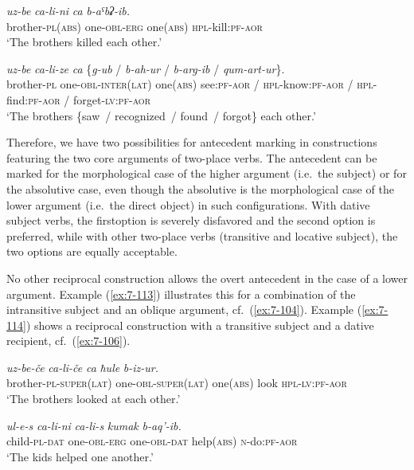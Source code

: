 ﻿\documentclass[output=paper]{langsci/langscibook}
\begin{document}
\ea %
\gll \emph{uz-be} \emph{ca-li-ni} \emph{ca} \emph{b-aˤbʡ-ib.}\\
brother-\textsc{pl}(\textsc{abs}) one-\textsc{obl}-\textsc{erg} one(\textsc{abs}) \textsc{hpl}-kill:\textsc{pf}-\textsc{aor}\\
\glt `The brothers killed each other.'

\ex\label{ex:7-112}
\gll \emph{uz-be} \emph{ca-li-ze} \emph{ca} \{\emph{g-ub} / \emph{b-ah-ur} / \emph{b-arg-ib} / \emph{qum-art-ur}\}.\\
brother-\textsc{pl} one-\textsc{obl}-\textsc{inter(lat)} one(\textsc{abs}) see:\textsc{pf}-\textsc{aor} / \textsc{hpl}-know:\textsc{pf}-\textsc{aor} / \textsc{hpl}-find:\textsc{pf}-\textsc{aor} / forget-\textsc{lv}:\textsc{pf}-\textsc{aor}\\
\glt `The brothers \{saw~/ recognized~/ found~/ forgot\} each other.'
\z

Therefore, we have two possibilities for antecedent marking in constructions
featuring the two core arguments of two-place verbs. The
antecedent can be marked for the morphological case of the higher argument
(i.e.\ the subject) or for the absolutive case, even though the
absolutive is the morphological case of the lower argument (i.e.\ the
direct object) in such configurations. With dative subject verbs, the
first\pagebreak[3] option is severely disfavored and the second option is preferred,
while with other two-place verbs (transitive and locative subject), the
two options are equally acceptable.

No other reciprocal construction allows the overt antecedent in the case
of a lower argument. Example (\ref{ex:7-113}) illustrates this for a combination of
the intransitive subject and an oblique argument, cf.\ (\ref{ex:7-104}). Example
(\ref{ex:7-114}) shows a reciprocal construction with a transitive subject and a
dative recipient, cf.\ (\ref{ex:7-106}).

\ea \label{ex:7-113}
\gll *\emph{uz-be-če} \emph{ca-li-če} \emph{ca} \emph{ħule} \emph{b-iz-ur.}\\
brother-\textsc{pl}-\textsc{super(lat)} one-\textsc{obl}-\textsc{super(lat)} one(\textsc{abs}) look \textsc{hpl}-\textsc{lv}:\textsc{pf}-\textsc{aor}\\
\glt `The brothers looked at each other.'

\ex \label{ex:7-114}
\gll *\emph{ul-e-s} \emph{ca-li-ni} \emph{ca-li-s} \emph{kumak} \emph{b-aq'-ib.}\\
child-\textsc{pl}-\textsc{dat} one-\textsc{obl}-\textsc{erg} one-\textsc{obl}-\textsc{dat} help(\textsc{abs}) \textsc{n}-do:\textsc{pf}-\textsc{aor}\\
\glt `The kids helped one another.'
\z
\end{document}
